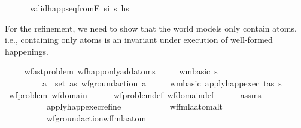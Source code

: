 \begin{isabellebody}
\ \ \ \ \ \ valid{\isacharunderscore}{\kern0pt}happ{\isacharunderscore}{\kern0pt}seq{\isacharunderscore}{\kern0pt}fromE\ {\isacharparenleft}{\kern0pt}si{\isacharplus}{\kern0pt}{}{\isacharparenright}{\kern0pt}\ s\ hs\isanewline
\ \ \ \ {\isacharbraceright}{\kern0pt}{\isachardoublequoteclose}%
\begin{isamarkuptext}%
For the refinement, we need to show that the world models only
    contain atoms, i.e., containing only atoms is an invariant under execution
    of well-formed happenings.%
\end{isamarkuptext}\isamarkuptrue%
\ \ \isamarkupfalse%
\ {\isacharparenleft}{\kern0pt}\ wf{\isacharunderscore}{\kern0pt}ast{\isacharunderscore}{\kern0pt}problem{\isacharparenright}{\kern0pt}\ wf{\isacharunderscore}{\kern0pt}happ{\isacharunderscore}{\kern0pt}only{\isacharunderscore}{\kern0pt}add{\isacharunderscore}{\kern0pt}atoms{\isacharcolon}{\kern0pt}\isanewline
\ \ \ \ \ {\isachardoublequoteopen}wm{\isacharunderscore}{\kern0pt}basic\ s{\isachardoublequoteclose}\ \isanewline
\ \ \ \ \ \ \ \ \ {\isachardoublequoteopen}{\isasymforall}a\ {\isasymin}\ set\ as{\isachardot}{\kern0pt}\ wf{\isacharunderscore}{\kern0pt}ground{\isacharunderscore}{\kern0pt}action\ a{\isachardoublequoteclose}\isanewline
\ \ \ \ \ {\isachardoublequoteopen}wm{\isacharunderscore}{\kern0pt}basic\ {\isacharparenleft}{\kern0pt}apply{\isacharunderscore}{\kern0pt}happ{\isacharunderscore}{\kern0pt}exec\ {\isacharparenleft}{\kern0pt}t{\isacharcomma}{\kern0pt}as{\isacharparenright}{\kern0pt}\ s{\isacharparenright}{\kern0pt}{\isachardoublequoteclose}\isanewline
%
\isadelimproof
\ \ \ \ %
\endisadelimproof
%
\isatagproof
{}\isamarkupfalse%
\ wf{\isacharunderscore}{\kern0pt}problem\ wf{\isacharunderscore}{\kern0pt}domain\isanewline
\ \ \ \ \isamarkupfalse%
\ wf{\isacharunderscore}{\kern0pt}problem{\isacharunderscore}{\kern0pt}def\ wf{\isacharunderscore}{\kern0pt}domain{\isacharunderscore}{\kern0pt}def\isanewline
\ \ \ \ \isamarkupfalse%
\ assms\ \isanewline
\ \ \ \ \ \ \ \ \ \ apply{\isacharunderscore}{\kern0pt}happ{\isacharunderscore}{\kern0pt}exec{\isacharunderscore}{\kern0pt}refine\ \isanewline
\ \ \ \ \ \ \ \ \ \ wf{\isacharunderscore}{\kern0pt}fmla{\isacharunderscore}{\kern0pt}atom{\isacharunderscore}{\kern0pt}alt\ \isanewline
\ \ \ \ \ \ \ \ \ \ wf{\isacharunderscore}{\kern0pt}ground{\isacharunderscore}{\kern0pt}action{\isacharunderscore}{\kern0pt}wf{\isacharunderscore}{\kern0pt}fmla{\isacharunderscore}{\kern0pt}atom\isanewline

\end{isabellebody}
